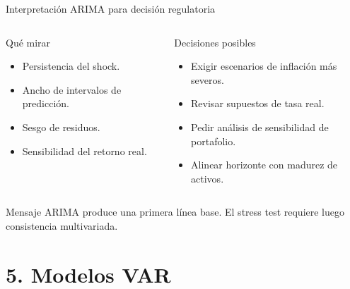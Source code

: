 \documentclass[10pt,aspectratio=169]{beamer}
\begin{document}
\begin{frame}{Interpretación ARIMA para decisión regulatoria}
\begin{columns}
\begin{block}{Qué mirar}
\begin{itemize}
  \item Persistencia del shock.
  \item Ancho de intervalos de predicción.
  \item Sesgo de residuos.
  \item Sensibilidad del retorno real.
\end{itemize}
\end{block}

\begin{block}{Decisiones posibles}
\begin{itemize}
  \item Exigir escenarios de inflación más severos.
  \item Revisar supuestos de tasa real.
  \item Pedir análisis de sensibilidad de portafolio.
  \item Alinear horizonte con madurez de activos.
\end{itemize}
\end{block}
\end{columns}

\vspace{0.4em}
\begin{block}{Mensaje}
ARIMA produce una primera línea base. El stress test requiere luego consistencia multivariada.
\end{block}
\end{frame}

\section{5. Modelos VAR}
\end{document}
